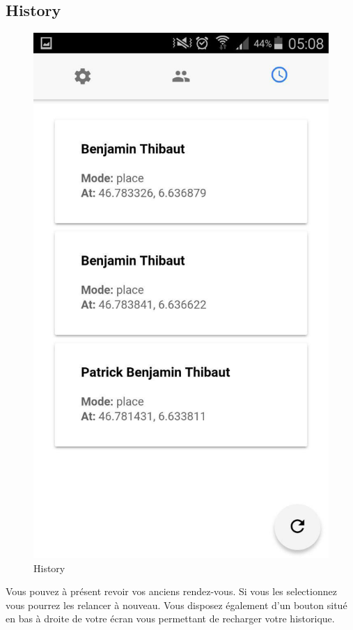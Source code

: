 \documentclass[french]{article}
\begin{document}
	\subsection{History}
	\begin{figure}[H]
		\centering
		\includegraphics[scale=0.4]{../screenshot/screenshot-history}
		\caption{History}
		\label{History}
	\end{figure} 
	Vous pouvez à présent revoir vos anciens rendez-vous. Si vous les selectionnez vous pourrez les relancer à nouveau.
	Vous disposez également d'un bouton situé en bas à droite de votre écran vous permettant de recharger votre historique.
	
\end{document}

